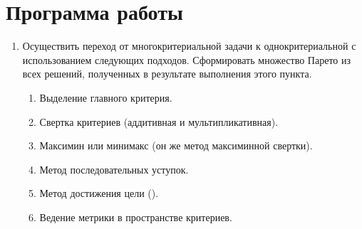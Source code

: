 





\tableofcontents
\newpage

\section{Программа работы}

\begin{enumerate}
	\item Осуществить переход от многокритериальной задачи к однокритериальной с использованием следующих подходов.  Сформировать множество Парето из всех решений, полученных в результате выполнения этого пункта.
		\begin{enumerate}
			\item Выделение главного критерия.
			\item Свертка критериев (аддитивная и мультипликативная).
			\item Максимин или минимакс (он же метод максиминной свертки).
			\item Метод последовательных уступок.
			\item Метод достижения цели (). 
			\item Ведение метрики в пространстве критериев.
		\end{enumerate}
\end{enumerate}

